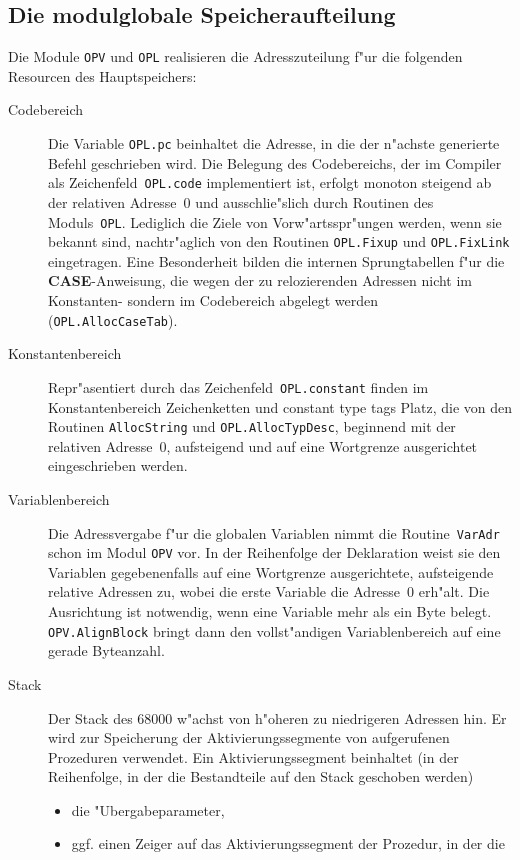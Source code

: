 \subsection{Die modulglobale Speicheraufteilung}

Die Module {\tt OPV} und {\tt OPL} realisieren die Adresszuteilung f"ur die folgenden
Resourcen des Hauptspeichers:
\begin{description}
\item[Codebereich] Die Variable {\tt OPL.pc} beinhaltet die Adresse, in die
  der n"achste generierte Befehl geschrieben wird.
  Die Belegung des Codebereichs, der im Compiler als Zeichenfeld~{\tt OPL.code}
  implementiert ist, erfolgt monoton steigend ab der relativen Adresse~0 und
  ausschlie"slich durch Routinen des Moduls~{\tt OPL}.
  Lediglich die Ziele von Vorw"artsspr"ungen werden, wenn sie bekannt sind,
  nachtr"aglich von den Routinen {\tt OPL.Fixup} und {\tt OPL.FixLink}
  eingetragen.
  Eine Besonderheit bilden die internen Sprungtabellen f"ur die {\bf CASE}-Anweisung,
  die wegen der zu relozierenden Adressen nicht im Konstanten- sondern im
  Codebereich abgelegt werden ({\tt OPL.AllocCaseTab}).
\item[Konstantenbereich] Repr"asentiert durch das Zeichenfeld~{\tt OPL.constant}
  finden im Konstantenbereich Zeichenketten und constant type tags Platz,
  die von den Routinen {\tt AllocString} und {\tt OPL.AllocTypDesc}, beginnend
  mit der relativen Adresse~0, aufsteigend und auf eine Wortgrenze ausgerichtet
  eingeschrieben werden.
\item[Variablenbereich] Die Adressvergabe f"ur die globalen Variablen nimmt
  die Routine~{\tt VarAdr} schon im Modul {\tt OPV} vor.
  In der Reihenfolge der Deklaration weist sie den Variablen gegebenenfalls
  auf eine Wortgrenze ausgerichtete, aufsteigende relative Adressen zu, wobei
  die erste Variable die Adresse~0 erh"alt.
  Die Ausrichtung ist notwendig, wenn eine Variable mehr als ein Byte belegt.
  {\tt OPV.AlignBlock} bringt dann den vollst"andigen Variablenbereich auf eine
  gerade Byteanzahl.
\item[Stack] Der Stack des 68000 w"achst von h"oheren zu niedrigeren Adressen
  hin.
  Er wird zur Speicherung der Aktivierungssegmente von aufgerufenen
  Prozeduren verwendet.
  Ein Aktivierungssegment beinhaltet (in der Reihenfolge, in der die Bestandteile
  auf den Stack geschoben werden)
  \begin{itemize}
  \item die "Ubergabeparameter,
  \item ggf. einen Zeiger auf das Aktivierungssegment der Prozedur, in der die

\end{itemize}
\end{description}
